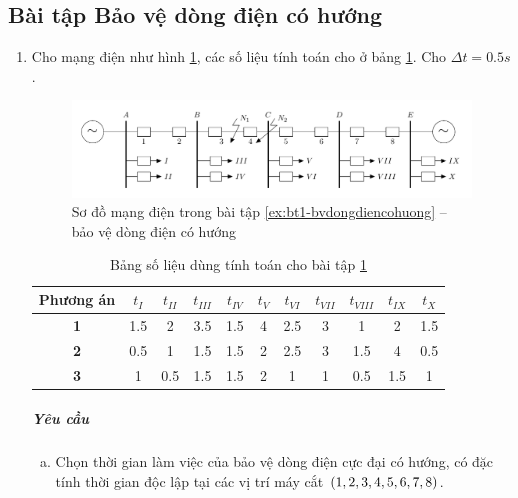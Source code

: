 \documentclass[12pt,a4paper]{article}
\begin{document}
\subsection{Bài tập Bảo vệ dòng điện có hướng}
	\begin{enumerate}
		\item \label{ex:bt1-bvdongdiencohuong} Cho mạng điện như hình \ref{Fig:bt1-bvdongdiencohuong}, các số liệu tính toán cho ở bảng \ref{Tab:bt1-baovedongdiencohuong}. Cho $\Delta t = 0.5 \unit{s}$.
			
			\begin{figure}[!h]
				\begin{center}
					\includegraphics[scale=1]{diagram-draw-tikz/Figure-baitap-baovedongdiencohuong-bt1.pdf}
				\end{center}
				\caption{Sơ đồ mạng điện trong bài tập \ref{ex:bt1-bvdongdiencohuong} -- bảo vệ dòng điện có hướng} \label{Fig:bt1-bvdongdiencohuong}
			\end{figure}
			
			\begin{table}[!h]
				\begin{center}
					\begin{tabular}{|c|c|c|c|c|c|c|c|c|c|c|}\hline 
					\textbf{Phương án} & $t_{I}$ & $t_{II}$ & $t_{III}$ & $t_{IV}$ & $t_{V}$ & $t_{VI}$ & $t_{VII}$ & $t_{VIII}$ & $t_{IX}$ & $t_{X}$ \\ \hline 
					\textbf{1} & 1.5 & 2 & 3.5 & 1.5 & 4 & 2.5 & 3 & 1 & 2 & 1.5 \\ \hline 
					\textbf{2} & 0.5 & 1 & 1.5 & 1.5 & 2 & 2.5 & 3 & 1.5 & 4 & 0.5 \\ \hline 
					\textbf{3} & 1 & 0.5 & 1.5 & 1.5 & 2 & 1 & 1 & 0.5 & 1.5 & 1 \\ \hline 
					\end{tabular} 
				\end{center}
				\caption{Bảng số liệu dùng tính toán cho bài tập \ref{Fig:bt1-bvdongdiencohuong}} \label{Tab:bt1-baovedongdiencohuong}
				\vspace{-.8cm}
			\end{table}
			
			\subparagraph{Yêu cầu}
				\begin{enumerate}[a.]
					\item Chọn thời gian làm việc của bảo vệ dòng điện cực đại có hướng, có đặc tính thời gian độc lập tại các vị trí máy cắt $\left({1, 2, 3, 4, 5, 6, 7, 8}\right)$.
					

\end{enumerate}
\end{enumerate}
\end{document}
